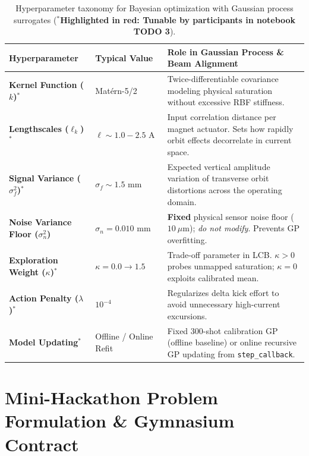 \documentclass[11pt,a4paper]{article}
\begin{document}
\begin{table}[h!]
\centering
\small
\begin{tabular}{@{}p{3.2cm} p{2.6cm} p{9.2cm}@{}}
\toprule
\textbf{Hyperparameter} & \textbf{Typical Value} & \textbf{Role in Gaussian Process \& Beam Alignment} \\
\midrule
\textbf{\color{tunablered}Kernel Function ($k$)$^*$} & Mat\'ern-5/2 & Twice-differentiable covariance modeling physical saturation without excessive RBF stiffness. \\
\textbf{\color{tunablered}Lengthscales ($\ell_k$)$^*$} & $\ell \sim 1.0 - 2.5\text{ A}$ & Input correlation distance per magnet actuator. Sets how rapidly orbit effects decorrelate in current space. \\
\textbf{\color{tunablered}Signal Variance ($\sigma_f^2$)$^*$} & $\sigma_f \sim 1.5\text{ mm}$ & Expected vertical amplitude variation of transverse orbit distortions across the operating domain. \\
\textbf{Noise Variance Floor ($\sigma_n^2$)} & $\sigma_n = 0.010\text{ mm}$ & \textbf{Fixed} physical sensor noise floor ($10\ \mu\text{m}$); \emph{do not modify}. Prevents GP overfitting. \\
\textbf{\color{tunablered}Exploration Weight ($\kappa$)$^*$} & $\kappa = 0.0 \to 1.5$ & Trade-off parameter in LCB. $\kappa > 0$ probes unmapped saturation; $\kappa = 0$ exploits calibrated mean. \\
\textbf{\color{tunablered}Action Penalty ($\lambda$)$^*$} & $10^{-4}$ & Regularizes delta kick effort to avoid unnecessary high-current excursions. \\
\textbf{\color{tunablered}Model Updating$^*$} & Offline / Online Refit & Fixed 300-shot calibration GP (offline baseline) or online recursive GP updating from \texttt{step\_callback}. \\
\bottomrule
\end{tabular}
\caption{Hyperparameter taxonomy for Bayesian optimization with Gaussian process surrogates (\textbf{\color{tunablered}$^*$Highlighted in red: Tunable by participants in notebook TODO 3}).}
\label{tab:bo_hyperparams}
\end{table}


\section{Mini-Hackathon Problem Formulation \& Gymnasium Contract}
\end{document}
